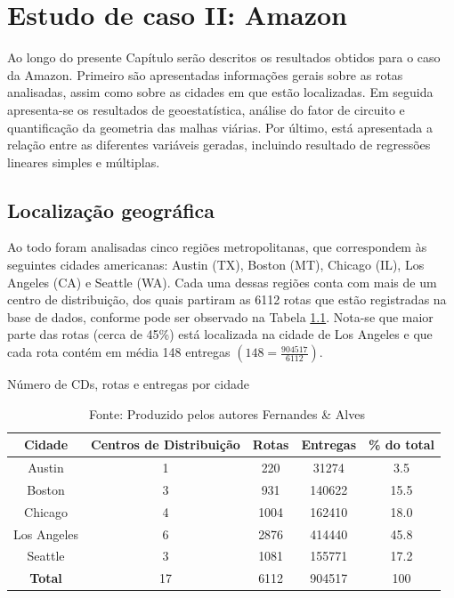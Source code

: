 \chapter{Estudo de caso II: Amazon} \label{sec:EstCasoAmazon}

Ao longo do presente Capítulo serão descritos os resultados obtidos para o caso da Amazon.
Primeiro são apresentadas informações gerais sobre as rotas analisadas, assim como sobre as cidades em que estão localizadas.
Em seguida apresenta-se os resultados de geoestatística, análise do fator de circuito e quantificação da geometria das malhas viárias.
Por último, está apresentada a relação entre as diferentes variáveis geradas, incluindo resultado de regressões lineares simples e múltiplas.

\section{Localização geográfica} \label{sec:loc_geografica_amazon}

Ao todo foram analisadas cinco regiões metropolitanas, que correspondem às seguintes cidades americanas: Austin (TX), Boston (MT), Chicago (IL), Los Angeles (CA) e Seattle (WA).
Cada uma dessas regiões conta com mais de um centro de distribuição, dos quais partiram as 6112 rotas que estão registradas na base de dados, conforme pode ser observado na Tabela \ref{tab:resumo_entregas}.
Nota-se que maior parte das rotas (cerca de 45\%) está localizada na cidade de Los Angeles e que cada rota contém em média 148 entregas $\left( 148 = \frac{904517}{6112} \right)$.

\singlespacing
\begin{table}[H]
    \caption{Número de CDs, rotas e entregas por cidade}
    \label{tab:resumo_entregas}
    \centering
    \begin{tabular}{|ccccc|}
        \hline
        \textbf{Cidade} &
        \textbf{Centros de Distribuição} &
        \textbf{Rotas} &
        \textbf{Entregas} &
        \textbf{\% do total}\\ \hline
        Austin         & 1  & 220  &  31274 & 3.5 \\
        Boston         & 3  & 931  & 140622 & 15.5\\
        Chicago        & 4  & 1004 & 162410 & 18.0\\
        Los Angeles    & 6  & 2876 & 414440 & 45.8\\
        Seattle        & 3  & 1081 & 155771 & 17.2\\ \hline
        \textbf{Total} & 17 & 6112 & 904517 & 100\\ \hline
    \end{tabular}
    \caption*{\ Fonte: Produzido pelos autores Fernandes \& Alves}
\end{table}
\onehalfspacing

